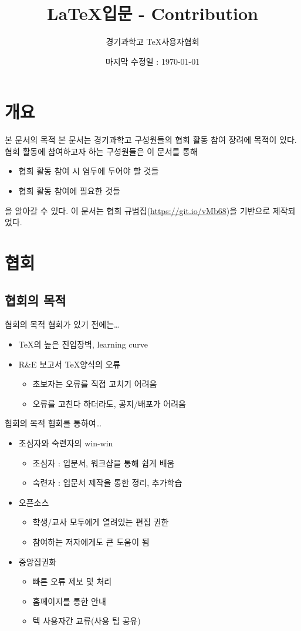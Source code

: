 \documentclass[12pt]{beamer}
\title[\LaTeX - Contribution]{\LaTeX 입문 - Contribution}
\author{경기과학고 \TeX 사용자협회}
\institute[GSHSTeXSociety]{\url{latex.gs.hs.kr}}
\date{마지막 수정일 : \today}
\begin{document}
\begin{frame}
\titlepage %
\end{frame}
\section{개요}
\begin{frame}{본 문서의 목적}
	본 문서는 경기과학고 구성원들의 협회 활동 참여 장려에 목적이 있다.
	협회 활동에 참여하고자 하는 구성원들은 이 문서를 통해
	\begin{itemize}
		\item 협회 활동 참여 시 염두에 두어야 할 것들
		\item 협회 활동 참여에 필요한 것들
	\end{itemize}
	을 알아갈 수 있다.
	\vfill
	이 문서는 협회 규범집(\url{https://git.io/vMb68})을 기반으로 제작되었다.
	\vfill
\end{frame}
\section{협회}
\subsection{협회의 목적}
\begin{frame}{협회의 목적}
	협회가 있기 전에는\ldots
	\begin{itemize}
		\item \TeX 의 높은 진입장벽, learning curve
		\item R\&E 보고서 \TeX 양식의 오류
		\begin{itemize}
			\item 초보자는 오류를 직접 고치기 어려움
			\item 오류를 고친다 하더라도, 공지/배포가 어려움
		\end{itemize}
	\end{itemize}
\end{frame}
\begin{frame}{협회의 목적}
	협회를 통하여\ldots
	\begin{itemize}
		\item 초심자와 숙련자의 win-win
		\begin{itemize}
			\item 초심자 : 입문서, 워크샵을 통해 쉽게 배움
			\item 숙련자 : 입문서 제작을 통한 정리, 추가학습
		\end{itemize}
		\item 오픈소스
		\begin{itemize}
			\item 학생/교사 모두에게 열려있는 편집 권한
			\item 참여하는 저자에게도 큰 도움이 됨
		\end{itemize}
		\item 중앙집권화
		\begin{itemize}
			\item 빠른 오류 제보 및 처리
			\item 홈페이지를 통한 안내
			\item 텍 사용자간 교류(사용 팁 공유)
		\end{itemize}
	\end{itemize}
\end{frame}
\end{document}
